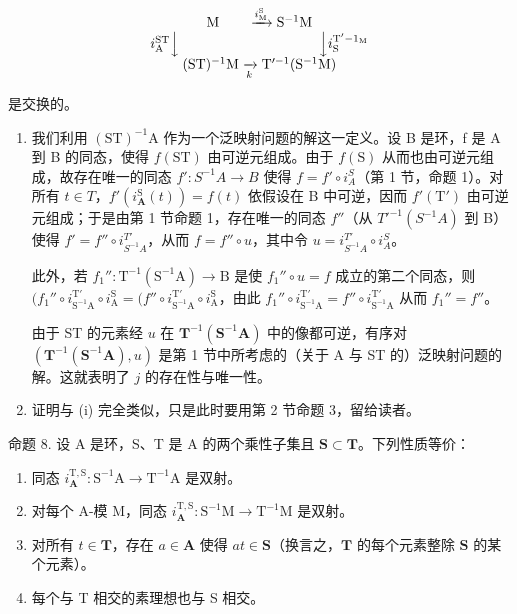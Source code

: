 \[
\begin{array}{c} \mathrm{M} \qquad \xrightarrow {i _ {\mathrm{M}} ^ {\mathrm{S}}} \mathrm{S} ^ {- 1} \mathrm{M} \\ i _ {\mathrm{A}} ^ {\mathrm{ST}} \Big \downarrow \qquad \qquad \qquad \qquad \qquad \Big \downarrow i _ {\mathrm{S}} ^ {\mathrm{T} ^ {\prime} - 1 _ {\mathrm{M}}} \\ (\mathrm{ST}) ^ {- 1} \mathrm{M} \xrightarrow [ k ]{} \mathrm{T} ^ {\prime - 1} (\mathrm{S} ^ {- 1} \mathrm{M}) \end{array}
\]

是交换的。

\begin{enumerate}
\def\labelenumi{(\roman{enumi})}
\tightlist
\item
  我们利用 \((\mathrm{ST})^{-1}\mathrm{A}\) 作为一个泛映射问题的解这一定义。设 B 是环，f 是 A 到 B 的同态，使得 \(f(\mathrm{ST})\) 由可逆元组成。由于 \(f(\mathrm{S})\) 从而也由可逆元组成，故存在唯一的同态 \(f': S^{-1}A \to B\) 使得 \(f = f' \circ i_{A}^{S}\)（第 1 节，命题 1）。对所有 \(t \in T\)，\(f'(i_{\mathbf{A}}^{\mathrm{S}}(t)) = f(t)\) 依假设在 B 中可逆，因而 \(f'(\mathrm{T}')\) 由可逆元组成；于是由第 1 节命题 1，存在唯一的同态 \(f''\)（从 \(T'^{-1}(S^{-1}A)\) 到 B）使得 \(f' = f'' \circ i_{S^{-1}A}^{T'}\)，从而 \(f = f'' \circ u\)，其中令 \(u = i_{S^{-1}A}^{T'} \circ i_{A}^{S}\)。

此外，若 \(f_1'' \colon \mathrm{T}^{-1}(\mathrm{S}^{-1}\mathrm{A}) \to \mathrm{B}\) 是使 \(f_1'' \circ u = f\) 成立的第二个同态，则 \((f_1'' \circ i_{\mathrm{S}^{-1}\mathrm{A}}^{\mathrm{T}'} \circ i_{\mathrm{A}}^{\mathrm{S}} = (f'' \circ i_{\mathrm{S}^{-1}\mathrm{A}}^{\mathrm{T}'} \circ i_{\mathrm{A}}^{\mathrm{S}} \text{，由此 } f_1'' \circ i_{\mathrm{S}^{-1}\mathrm{A}}^{\mathrm{T}'} = f'' \circ i_{\mathrm{S}^{-1}\mathrm{A}}^{\mathrm{T}'} \text{ 从而 } f_1'' = f''\)。

由于 ST 的元素经 \(u\) 在 \(\mathbf{T}^{-1}(\mathbf{S}^{-1}\mathbf{A})\) 中的像都可逆，有序对 \((\mathbf{T}^{-1}(\mathbf{S}^{-1}\mathbf{A}), u)\) 是第 1 节中所考虑的（关于 A 与 ST 的）泛映射问题的解。这就表明了 \(j\) 的存在性与唯一性。

\item
  证明与 (i) 完全类似，只是此时要用第 2 节命题 3，留给读者。
\end{enumerate}

命题 8. 设 A 是环，S、T 是 A 的两个乘性子集且 \(\mathbf{S} \subset \mathbf{T}\)。下列性质等价：

\begin{enumerate}
\def\labelenumi{(\alph{enumi})}
\item
  同态 \(i_{\mathbf{A}}^{\mathrm{T},\mathrm{S}}: \mathrm{S}^{-1}\mathrm{A} \to \mathrm{T}^{-1}\mathrm{A}\) 是双射。
\item
  对每个 A-模 M，同态 \(i_{\mathbf{A}}^{\mathrm{T},\mathrm{S}}: \mathrm{S}^{-1}\mathrm{M} \to \mathrm{T}^{-1}\mathrm{M}\) 是双射。
\item
  对所有 \(t \in \mathbf{T}\)，存在 \(a \in \mathbf{A}\) 使得 \(at \in \mathbf{S}\)（换言之，\(\mathbf{T}\) 的每个元素整除 \(\mathbf{S}\) 的某个元素）。
\item
  每个与 T 相交的素理想也与 S 相交。
\end{enumerate}

